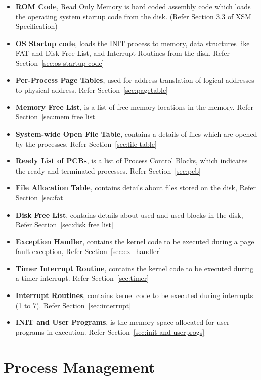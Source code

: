 \documentclass[10pt]{report}
\begin{document}
\begin{itemize}
	\item \textbf{ROM Code}, Read Only Memory is hard coded assembly code which loads the operating system startup code from the disk. (Refer Section 3.3 of XSM Specification) 
	\item \textbf{OS Startup code}, loads the INIT process to memory, data structures like FAT and Disk Free List, and Interrupt Routines from the disk. Refer Section~\ref{sec:os startup code}
	\item \textbf{Per-Process Page Tables}, used for address translation of logical addresses to physical address. Refer Section~\ref{sec:pagetable}
	\item \textbf{Memory Free List}, is a list of free memory locations in the memory. Refer Section~\ref{sec:mem free list}
	\item \textbf{System-wide Open File Table}, contains a details of files which are opened by the processes. Refer Section~\ref{sec:file table}
	\item \textbf{Ready List of PCBs}, is a list of Process Control Blocks, which indicates the ready and terminated processes. Refer Section~\ref{sec:pcb}
	\item \textbf{File Allocation Table}, contains details about files stored on the disk, Refer Section~\ref{sec:fat}
	\item \textbf{Disk Free List}, contains details about used and used blocks in the disk, Refer Section~\ref{sec:disk free list}
	\item \textbf{Exception Handler}, contains the kernel code to be executed during a page fault exception, Refer Section~\ref{sec:ex_handler}
	\item \textbf{Timer Interrupt Routine}, contains the kernel code to be executed during a timer interrupt. Refer Section~\ref{sec:timer}
	
	\item \textbf{Interrupt Routines}, contains kernel code to be executed during interrupts (1 to 7). Refer Section~\ref{sec:interrupt}
	\item \textbf{INIT and User Programs}, is the memory space allocated for user programs in execution. Refer Section~\ref{sec:init and userprogs}
\end{itemize}




\chapter{Process Management}
\label{chp:process}
\end{document}
